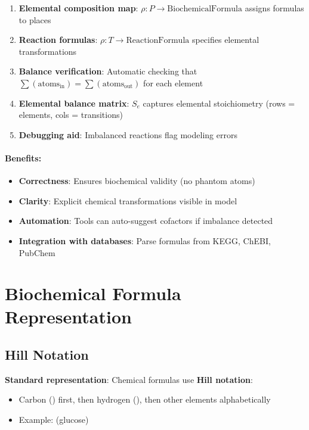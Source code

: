 \begin{enumerate}
    \item \textbf{Elemental composition map}: $\rho: P \to \text{BiochemicalFormula}$ assigns formulas to places
    \item \textbf{Reaction formulas}: $\rho: T \to \text{ReactionFormula}$ specifies elemental transformations
    \item \textbf{Balance verification}: Automatic checking that $\sum(\text{atoms}_{\text{in}}) = \sum(\text{atoms}_{\text{out}})$ for each element
    \item \textbf{Elemental balance matrix}: $S_e$ captures elemental stoichiometry (rows = elements, cols = transitions)
    \item \textbf{Debugging aid}: Imbalanced reactions flag modeling errors
\end{enumerate}

\paragraph{Benefits:}
\begin{itemize}
    \item \textbf{Correctness}: Ensures biochemical validity (no phantom atoms)
    \item \textbf{Clarity}: Explicit chemical transformations visible in model
    \item \textbf{Automation}: Tools can auto-suggest cofactors if imbalance detected
    \item \textbf{Integration with databases}: Parse formulas from KEGG, ChEBI, PubChem
\end{itemize}

\section{Biochemical Formula Representation}
\label{sec:formula-representation}

\subsection{Hill Notation}
\label{subsec:hill-notation}

\textbf{Standard representation}: Chemical formulas use \textbf{Hill notation}:
\begin{itemize}
    \item Carbon () first, then hydrogen (), then other elements alphabetically
    \item Example:  (glucose)
\end{itemize}


